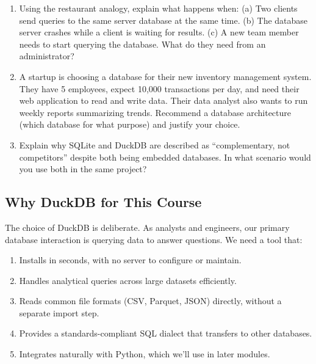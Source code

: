 \documentclass[
  letterpaper,
  DIV=11,
  numbers=noendperiod]{scrreprt}
\providecommand{\tightlist}{%
  \setlength{\itemsep}{0pt}\setlength{\parskip}{0pt}}
\begin{document}
\begin{tcolorbox}[enhanced jigsaw, opacitybacktitle=0.6, arc=.35mm, colback=white, bottomtitle=1mm, opacityback=0, toprule=.15mm, left=2mm, colbacktitle=quarto-callout-note-color!10!white, breakable, coltitle=black, toptitle=1mm, colframe=quarto-callout-note-color-frame, bottomrule=.15mm, titlerule=0mm, title=\textcolor{quarto-callout-note-color}{\faInfo}\hspace{0.5em}{Exercises}, rightrule=.15mm, leftrule=.75mm]

\begin{enumerate}
\def\labelenumi{\arabic{enumi}.}
\item
  Using the restaurant analogy, explain what happens when: (a) Two
  clients send queries to the same server database at the same time. (b)
  The database server crashes while a client is waiting for results. (c)
  A new team member needs to start querying the database. What do they
  need from an administrator?
\item
  A startup is choosing a database for their new inventory management
  system. They have 5 employees, expect 10,000 transactions per day, and
  need their web application to read and write data. Their data analyst
  also wants to run weekly reports summarizing trends. Recommend a
  database architecture (which database for what purpose) and justify
  your choice.
\item
  Explain why SQLite and DuckDB are described as ``complementary, not
  competitors'' despite both being embedded databases. In what scenario
  would you use both in the same project?
\end{enumerate}

\end{tcolorbox}

\subsection{Why DuckDB for This
Course}\label{why-duckdb-for-this-course}

The choice of DuckDB is deliberate. As analysts and engineers, our
primary database interaction is querying data to answer questions. We
need a tool that:

\begin{enumerate}
\def\labelenumi{\arabic{enumi}.}
\tightlist
\item
  Installs in seconds, with no server to configure or maintain.
\item
  Handles analytical queries across large datasets efficiently.
\item
  Reads common file formats (CSV, Parquet, JSON) directly, without a
  separate import step.
\item
  Provides a standards-compliant SQL dialect that transfers to other
  databases.
\item
  Integrates naturally with Python, which we'll use in later modules.
\end{enumerate}
\end{document}
